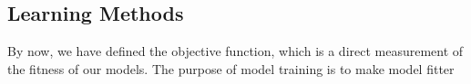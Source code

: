 \subsection {Learning Methods}
By now, we have defined the objective function, which is a direct measurement of the fitness of our models. The purpose of model training is to make model fitter 